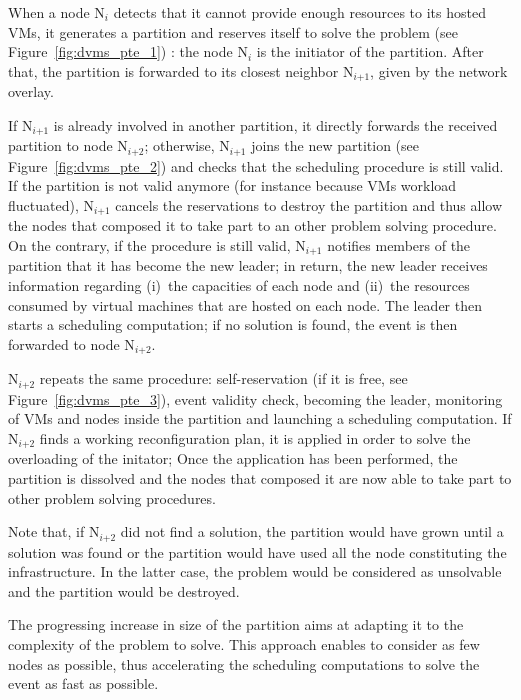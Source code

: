 When a node N\(_{\textit{i}}\) detects that it cannot provide enough resources
to its hosted VMs, it generates a partition and reserves itself to solve the
problem (see Figure~\ref{fig:dvms_pte_1}) : the node N\(_{\textit{i}}\) is the
initiator of the partition. After that, the partition is forwarded to its
closest neighbor N\(_{\textit{i+1}}\), given by the network overlay.

If N\(_{\textit{i+1}}\) is already involved in another partition, it directly
forwards the received partition to node N\(_{\textit{i+2}}\); otherwise,
N\(_{\textit{i+1}}\) joins the new partition (see Figure~\ref{fig:dvms_pte_2})
and checks that the scheduling procedure is still valid.  If the partition is
not valid anymore (for instance because VMs workload fluctuated),
N\(_{\textit{i+1}}\) cancels the reservations to destroy
the partition and thus allow the nodes that composed it to take part to an other
problem solving procedure.
%
On the contrary, if the procedure is still valid, N\(_{\textit{i+1}}\) notifies
members of the partition that it has become the new leader; in return, the new
leader receives information regarding (i)~the capacities of each node and
(ii)~the resources consumed by virtual machines that are hosted on each node.
The leader then starts a scheduling computation; if no solution is found, the
event is then forwarded to node N\(_{\textit{i+2}}\).

N\(_{\textit{i+2}}\) repeats the same procedure: self-reservation
(if it is free, see Figure~\ref{fig:dvms_pte_3}), event validity check, becoming
the leader, monitoring of VMs and nodes inside the partition and launching a
scheduling computation.  If N\(_{\textit{i+2}}\) finds a working reconfiguration
plan, it is applied in order to solve the overloading of the initator; Once the
application has been performed, the partition is dissolved and the nodes that
composed it are now able to take part to other problem solving procedures.

Note that, if N\(_{\textit{i+2}}\) did not find a solution, the partition would
have grown until a solution was found or the partition would have used all the
node constituting the infrastructure. In the latter case, the problem would be
considered as unsolvable and the partition would be destroyed.

The progressing increase in size of the partition aims at adapting it to the
complexity of the problem to solve.
This approach enables to consider as few nodes as possible, thus accelerating
the scheduling computations to solve the event as fast as possible.


